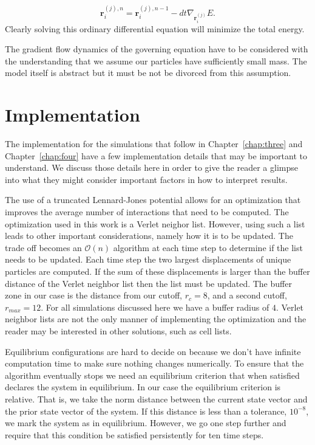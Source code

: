 \begin{equation}
    \textbf{r}_i^{(j),n} = \textbf{r}_i^{(j),n-1} - dt\nabla_{\textbf{r}_i^{(j)}}E.
\end{equation}
Clearly solving this ordinary differential equation will minimize the total energy.

The gradient flow dynamics of the governing equation have to be considered with the understanding that we assume our particles have sufficiently small mass. The model itself is abstract but it must be not be divorced from this assumption.

\section{Implementation}

   The implementation for the simulations that follow in Chapter~\ref{chap:three} and Chapter~\ref{chap:four} have a few implementation details that may be important to understand. We discuss those details here in order to give the reader a glimpse into what they might consider important factors in how to interpret results.

   The use of a truncated Lennard-Jones potential allows for an optimization that improves the average number of interactions that need to be computed. The optimization used in this work is a Verlet neighor list. However, using such a list leads to other important considerations, namely how it is to be updated. The trade off becomes an $\mathcal{O}(n)$ algorithm at each time step to determine if the list needs to be updated. Each time step the two largest displacements of unique particles are computed. If the sum of these displacements is larger than the buffer distance of the Verlet neighbor list then the list must be updated. The buffer zone in our case is the distance from our cutoff, $r_c = 8$, and a second cutoff, $r_{max} = 12$. For all simulations discussed here we have a buffer radius of $4$. Verlet neighbor lists are not the only manner of implementing the optimization and the reader may be interested in other solutions, such as cell lists.

   Equilibrium configurations are hard to decide on because we don't have infinite computation time to make sure nothing changes numerically. To ensure that the algorithm eventually stops we need an equilibrium criterion that when satisfied declares the system in equilibrium. In our case the equilibrium criterion is relative. That is, we take the norm distance between the current state vector and the prior state vector of the system. If this distance is less than a tolerance, $10^{-8}$, we mark the system as in equilibrium. However, we go one step further and require that this condition be satisfied persistently for ten time steps.

